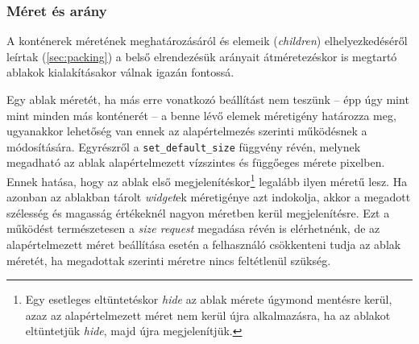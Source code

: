 \subsubsection{Méret és arány}

A konténerek méretének meghatározásáról és elemeik (\textit{children}) elhelyezkedéséről leírtak (\ref{sec:packing}) a belső elrendezésük arányait átméretezéskor is megtartó ablakok kialakításakor válnak igazán fontossá.

Egy ablak méretét, ha más erre vonatkozó beállítást nem teszünk -- épp úgy mint mint minden más konténerét -- a benne lévő elemek méretigény határozza meg, ugyanakkor lehetőség van ennek az alapértelmezés szerinti működésnek a módosítására. Egyrészről a \texttt{set\_default\_size} függvény révén, melynek megadható az ablak alapértelmezett vízszintes és függőeges mérete pixelben. Ennek hatása, hogy az ablak első megjelenítéskor\footnote{Egy esetleges eltüntetéskor \textit{hide} az ablak mérete úgymond mentésre kerül, azaz az alapértelmezett méret nem kerül újra alkalmazásra, ha az ablakot eltüntetjük \textit{hide}, majd újra megjelenítjük.} legalább ilyen méretű lesz. Ha azonban az ablakban tárolt \textit{widget}ek méretigénye azt indokolja, akkor a megadott szélesség és magasság értékeknél nagyon méretben kerül megjelenítésre. Ezt a működést természetesen a \textit{size request} megadása révén is elérhetnénk, de az alapértelmezett méret beállítása esetén a felhasználó csökkenteni tudja az ablak méretét, ha megadottak szerinti méretre nincs feltétlenül szükség.

